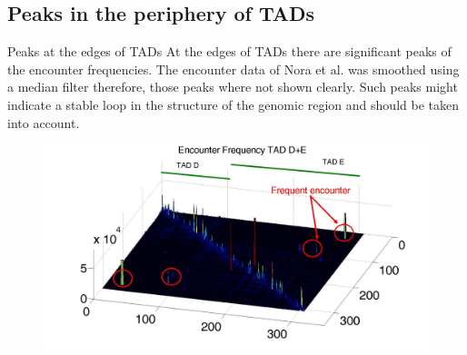 \documentclass[8pt]{beamer}
\begin{document}
\subsection{Peaks in the periphery of TADs}\label{subsection_peaksInThePeripheryOfTADs}
\begin{frame}{Peaks at the edges of TADs}
At the edges of TADs there are significant peaks of the encounter frequencies.
The encounter data of Nora et al. was smoothed using a median filter therefore, those peaks where not shown clearly.
Such peaks might indicate a stable loop in the structure of the genomic region and should be taken into account.

\begin{figure}[H]
\includegraphics[scale=0.2]{peaksOfTADDAndEInSurfPlot}
\end{figure}
\end{frame}
\end{document}
